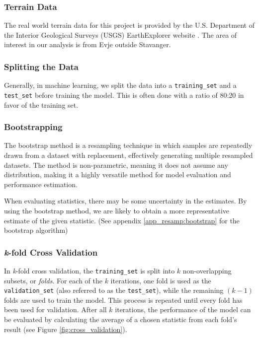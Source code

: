\documentclass{article}
\begin{document}
\begin{multicols}{2}
\subsubsection*{Terrain Data} 
The real world terrain data for this project is provided by the U.S. Department of the Interior Geological Surveys (USGS) EarthExplorer website \cite{earth_resources_observation_and_science_eros_center_shuttle_2017}. The area of interest in our analysis is from Evje outside Stavanger.

\subsubsection*{Splitting the Data}
Generally, in machine learning, we split the data into a \texttt{training\_set} and a \texttt{test\_set} before training the model. This is often done with a ratio of 80:20 in favor of the training set. \cite{joseph_optimal_2022}

\subsubsection*{Bootstrapping}
The bootstrap method is a resampling technique in which samples are repeatedly drawn from a dataset with replacement, effectively generating multiple resampled datasets. The method is non-parametric, meaning it does not assume any distribution, making it a highly versatile method for model evaluation and performance estimation.

When evaluating statistics, there may be some uncertainty in the estimates. By using the bootstrap method, we are likely to obtain a more representative estimate of the given statistic. \cite{storvik_bootstrapping_nodate}
(See appendix \ref{app_resamp:bootstrap} for the bootstrap algorithm)

\subsubsection*{\textit{k}-fold Cross Validation}
In \textit{k}-fold cross validation, the \texttt{training\_set} is split into $k$ non-overlapping subsets, or \textit{folds}. For each of the $k$ iterations, one fold is used as the \texttt{validation\_set} (also referred to as the \texttt{test\_set}), while the remaining $(k-1)$ folds are used to train the model. This process is repeated until every fold has been used for validation. After all $k$ iterations, the performance of the model can be evaluated by calculating the average of a chosen statistic from each fold's result (see Figure \ref{fig:cross_validation}). %


\end{multicols}
\end{document}
